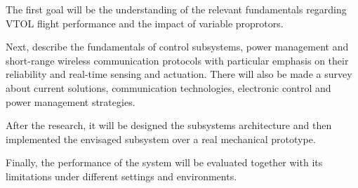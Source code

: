 The first goal will be the understanding of the relevant fundamentals regarding \gls{VTOL} flight performance and the impact of variable proprotors.

Next, describe the fundamentals of control subsystems, power management and short-range wireless communication protocols with particular emphasis on their reliability and real-time sensing and actuation.
There will also be made a survey about current solutions, communication technologies, electronic control and power management strategies.

After the research, it will be designed the subsystems architecture and then implemented the envisaged subsystem over a real mechanical prototype.

Finally, the performance of the system will be evaluated together with its limitations under different settings and environments.

